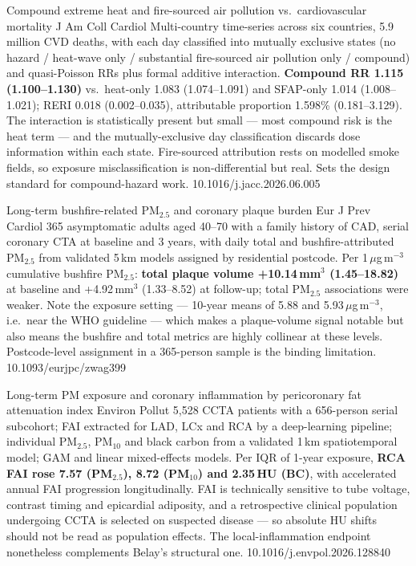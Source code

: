 \documentclass[10pt]{article}
\begin{document}
\clearpage


{Compound extreme heat and fire-sourced air pollution vs.\ cardiovascular mortality}
{J Am Coll Cardiol}
{Multi-country time-series across six countries, 5.9 million CVD deaths, with each day
classified into mutually exclusive states (no hazard / heat-wave only / substantial
fire-sourced air pollution only / compound) and quasi-Poisson RRs plus formal additive
interaction. \textbf{Compound RR 1.115 (1.100--1.130)} vs.\ heat-only 1.083
(1.074--1.091) and SFAP-only 1.014 (1.008--1.021); RERI 0.018 (0.002--0.035),
attributable proportion 1.598\% (0.181--3.129). The interaction is statistically present
but small --- most compound risk is the heat term --- and the mutually-exclusive day
classification discards dose information within each state. Fire-sourced attribution
rests on modelled smoke fields, so exposure misclassification is non-differential but
real. Sets the design standard for compound-hazard work.}
{10.1016/j.jacc.2026.06.005}

{Long-term bushfire-related PM$_{2.5}$ and coronary plaque burden}
{Eur J Prev Cardiol}
{365 asymptomatic adults aged 40--70 with a family history of CAD, serial coronary CTA at
baseline and 3 years, with daily total and bushfire-attributed PM$_{2.5}$ from validated
5\,km models assigned by residential postcode. Per 1\,$\mu$g\,m$^{-3}$ cumulative
bushfire PM$_{2.5}$: \textbf{total plaque volume +10.14\,mm$^3$ (1.45--18.82)} at
baseline and +4.92\,mm$^3$ (1.33--8.52) at follow-up; total PM$_{2.5}$ associations were
weaker. Note the exposure setting --- 10-year means of 5.88 and 5.93\,$\mu$g\,m$^{-3}$,
i.e.\ near the WHO guideline --- which makes a plaque-volume signal notable but also
means the bushfire and total metrics are highly collinear at these levels. Postcode-level
assignment in a 365-person sample is the binding limitation.}
{10.1093/eurjpc/zwag399}

{Long-term PM exposure and coronary inflammation by pericoronary fat attenuation index}
{Environ Pollut}
{5{,}528 CCTA patients with a 656-person serial subcohort; FAI extracted for LAD, LCx and
RCA by a deep-learning pipeline; individual PM$_{2.5}$, PM$_{10}$ and black carbon from a
validated 1\,km spatiotemporal model; GAM and linear mixed-effects models. Per IQR of
1-year exposure, \textbf{RCA FAI rose 7.57 (PM$_{2.5}$), 8.72 (PM$_{10}$) and 2.35\,HU
(BC)}, with accelerated annual FAI progression longitudinally. FAI is technically
sensitive to tube voltage, contrast timing and epicardial adiposity, and a retrospective
clinical population undergoing CCTA is selected on suspected disease --- so absolute HU
shifts should not be read as population effects. The local-inflammation endpoint
nonetheless complements Belay's structural one.}
{10.1016/j.envpol.2026.128840}
\end{document}
